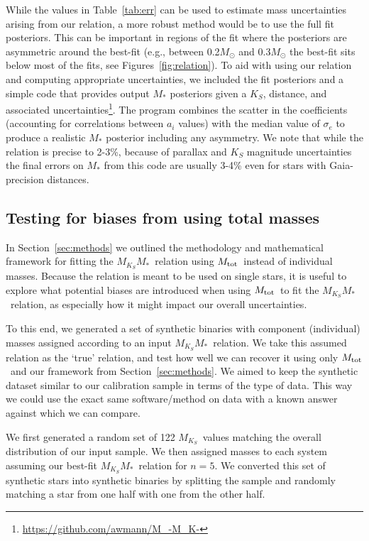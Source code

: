 \documentclass[twocolumn]{aastex62}
\newcommand{\mks}{$M_{K_S}$}
\newcommand{\mmk}{$M_{K_S}$\textendash$M_*$}
\newcommand{\order}{5}
\newcommand{\mtot}{$M_{\rm{tot}}$}
\begin{document}
While the values in Table~\ref{tab:err} can be used to estimate mass uncertainties arising from our relation, a more robust method would be to use the full fit posteriors. This can be important in regions of the fit where the posteriors are asymmetric around the best-fit (e.g., between 0.2$M_\odot$  and 0.3$M_\odot$ the best-fit sits below most of the fits, see Figures~\ref{fig:relation}). To aid with using our relation and computing appropriate uncertainties, we included the fit posteriors and a simple code that provides output $M_*$ posteriors given a $K_S$, distance, and associated uncertainties\footnote{\href{https://github.com/awmann/M_-M_K-}{https://github.com/awmann/M\_-M\_K-}}. The program combines the scatter in the coefficients (accounting for correlations between $a_i$ values) with the median value of $\sigma_e$ to produce a realistic $M_*$ posterior including any asymmetry. We note that while the relation is precise to 2-3\%, because of parallax and $K_S$ magnitude uncertainties the final errors on $M_*$ from this code are usually 3-4\% even for stars with Gaia-precision distances. 


\subsection{Testing for biases from using total masses}\label{sec:totalvsind}
In Section~\ref{sec:methods} we outlined the methodology and mathematical framework for fitting the \mmk\ relation using \mtot\ instead of individual masses. Because the relation is meant to be used on single stars, it is useful to explore what potential biases are introduced when using \mtot\ to fit the \mmk\ relation, as especially how it might impact our overall uncertainties. 

To this end, we generated a set of synthetic binaries with component (individual) masses assigned according to an input \mmk\ relation. We take this assumed relation as the `true' relation, and test how well we can recover it using only \mtot\ and our framework from Section~\ref{sec:methods}. We aimed to keep the synthetic dataset similar to our calibration sample in terms of the type of data. This way we could use the exact same software/method on data with a known answer against which we can compare. 

We first generated a random set of 122 \mks\ values matching the overall distribution of our input sample. We then assigned masses to each system assuming our best-fit \mmk\ relation for $n=\order$.  We converted this set of synthetic stars into synthetic binaries by splitting the sample and randomly matching a star from one half with one from the other half. 
\end{document}

